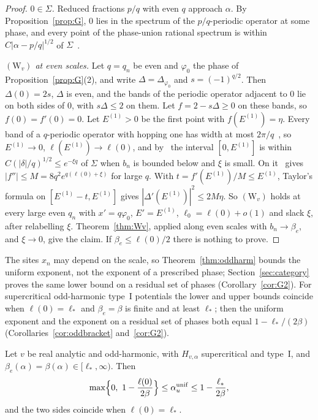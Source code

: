 \begin{proof}
\emph{$0\in\Sigma$.} Reduced fractions $p/q$ with even $q$ approach $\alpha$. By Proposition~\ref{prop:G}, $0$ lies in the spectrum of the $p/q$-periodic operator at some phase, and every point of the phase-union rational spectrum is within $C|\alpha-p/q|^{1/2}$ of $\Sigma$~\cite[Lemma~2.7(1)]{DMuniv}.

\emph{$(\mathrm W_v)$ at even scales.} Let $q=q_n$ be even and $\varphi_0$ the phase of Proposition~\ref{prop:G}(2), and write $\Delta=\Delta_{\varphi_0}$ and $s=(-1)^{q/2}$. Then $\Delta(0)=2s$, $\Delta$ is even, and the bands of the periodic operator adjacent to $0$ lie on both sides of $0$, with $s\Delta\le2$ on them. Let $f=2-s\Delta\ge0$ on these bands, so $f(0)=f'(0)=0$. Let $E^{(1)}>0$ be the first point with $f(E^{(1)})=\eta$. Every band of a $q$-periodic operator with hopping one has width at most $2\pi/q$~\cite[proof of Lemma~5.4]{DMuniv}, so $E^{(1)}\to0$, $\ell(E^{(1)})\to\ell(0)$, and by~\cite[Lemma~2.7(1)]{DMuniv} the interval $[0,E^{(1)}]$ is within $C(|\delta|/q)^{1/2}\le e^{-\xi q}$ of $\Sigma$ when $b_n$ is bounded below and $\xi$ is small. On it~\cite[Corollary~5.6]{DMuniv} gives $|f''|\le M=8q^2e^{q(\ell(0)+\xi)}$ for large $q$. With $t=f'(E^{(1)})/M\le E^{(1)}$, Taylor's formula on $[E^{(1)}-t,E^{(1)}]$ gives $|\Delta'(E^{(1)})|^2\le2M\eta$. So $(\mathrm W_v)$ holds at every large even $q_n$ with $x'=q\varphi_0$, $E'=E^{(1)}$, $\ell_0=\ell(0)+o(1)$ and slack $\xi$, after relabelling $\xi$. Theorem~\ref{thm:Wv}, applied along even scales with $b_n\to\beta_e$, and $\xi\to0$, give the claim. If $\beta_e\le\ell(0)/2$ there is nothing to prove.
\end{proof}

The sites $x_n$ may depend on the scale, so Theorem~\ref{thm:oddharm} bounds the uniform exponent, not the exponent of a prescribed phase; Section~\ref{sec:category} proves the same lower bound on a residual set of phases (Corollary~\ref{cor:G2}). For supercritical odd-harmonic type~I potentials the lower and upper bounds coincide when $\ell(0)=\ell_*$ and $\beta_e=\beta$ is finite and at least $\ell_*$; then the uniform exponent and the exponent on a residual set of phases both equal $1-\ell_*/(2\beta)$ (Corollaries~\ref{cor:oddbracket} and~\ref{cor:G2}).

\begin{corollary}\label{cor:oddbracket}
Let $v$ be real analytic and odd-harmonic, with $H_{v,\alpha}$ supercritical and type~I, and $\beta_e(\alpha)=\beta(\alpha)\in[\ell_*,\infty)$. Then
\[
\max\Bigl\{0,\ 1-\frac{\ell(0)}{2\beta}\Bigr\}\le\aunif\le1-\frac{\ell_*}{2\beta},
\]
and the two sides coincide when $\ell(0)=\ell_*$.
\end{corollary}

